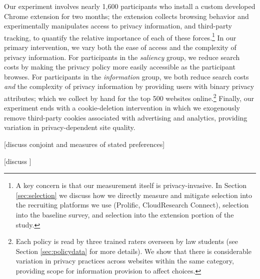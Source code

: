 \documentclass[12pt]{article}
\theoremstyle{definition}
\theoremstyle{remark}
\begin{document}
Our experiment involves nearly 1,600 participants who install a custom developed Chrome extension for two months; the extension collects browsing behavior and experimentally manipulates access to privacy information, and third-party tracking, to quantify the relative importance of each of these forces.\footnote{A key concern is that our measurement itself is privacy-invasive. In Section \ref{sec:selection} we discuss how we directly measure and mitigate selection into the recruiting platforms we use (Prolific, CloudResearch Connect), selection into the baseline survey, and selection into the extension portion of the study.} In our primary intervention, we vary both the ease of access and the complexity of privacy information. For participants in the \textit{saliency} group, we reduce search costs by making the privacy policy more easily accessible as the participant browses. For participants in the \textit{information} group, we both reduce search costs \emph{and} the complexity of privacy information by providing users with binary privacy attributes; which we collect by hand for the top 500 websites online.\footnote{Each policy is read by three trained raters overseen by law students (see Section \ref{sec:policydata} for more details). We show that there is considerable variation in privacy practices across websites within the same category, providing scope for information provision to affect choices.} Finally, our experiment ends with a cookie-deletion intervention in which we exogenously remove third-party cookies associated with advertising and analytics, providing variation in privacy-dependent site quality.

[discuss conjoint and measures of stated preferences]

[discuss ]
\end{document}
